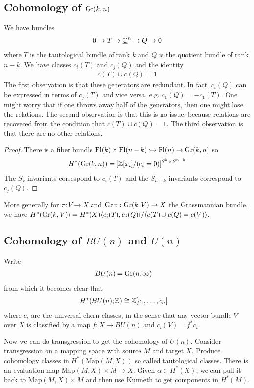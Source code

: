 \documentclass[12pt]{article}
\begin{document}
    \subsection{Cohomology of $\operatorname{Gr}(k,n)$}
    We have bundles \begin{align*}
        0 \to T \to \underline{\mathbb{C}}^n \to Q \to 0
    \end{align*} where $T$ is the tautological bundle of rank $k$ and $Q$ is the quotient bundle of rank $n-k$. We have classes $c_i(T)$ and $c_j(Q)$ and the identity \begin{align*}
        c(T) \cup c(Q) = 1
    \end{align*} The first observation is that these generators are redundant. In fact, $c_i(Q)$ can be expressed in terms of $c_j(T)$ and vice versa, e.g. $c_1(Q) = -c_1(T)$. One might worry that if one throws away half of the generators, then one might lose the relations. The second observation is that this is no issue, because relations are recovered from the condition that $c(T) \cup c(Q) = 1$. The third observation is that there are no other relations. 

    \begin{proof}
        There is a fiber bundle $\operatorname{Fl}(k)\times \operatorname{Fl}(n-k) \hookrightarrow \operatorname{Fl}(n) \to \operatorname{Gr}(k,n)$ so \[H^*(\operatorname{Gr}(k,n)) = [\mathbb{Z}[x_i]/(e_i = 0)]^{S^k \times S^{n-k}}\] The $S_k$ invariants correspond to $c_i(T)$ and the $S_{n-k}$ invariants correspond to $c_j(Q)$. 
    \end{proof}
    More generally for $\pi:V\to X$ and $\operatorname{Gr} \pi: \operatorname{Gr}(k,V) \to X$ the Grassmannian bundle, we have $H^*(\operatorname{Gr}(k,V)) = H^*(X)\langle c_i(T), c_j(Q) \rangle/\langle c(T) \cup c(Q) = c(V) \rangle$.

    \subsection{Cohomology of $BU(n)$ and $U(n)$}

    Write \begin{align*}
    BU(n) &= \operatorname{Gr}(n, \infty) 
    \end{align*} from which it becomes clear that \begin{align*}
    H^*(BU(n); \mathbb{Z}) &\cong \mathbb{Z}[c_1,\dots, c_n]
    \end{align*} where $c_i$ are the universal chern classes, in the sense that any vector bundle $V$ over $X$ is classified by a map $f: X \to BU(n)$ and $c_i(V) = f^* c_i$. 

    Now we can do transgression to get the cohomology of $U(n)$. Consider transgression on a mapping space with source $M$ and target $X$. Produce cohomology classes in $H^*(\mathrm{Map}(M,X))$ so called tautological classes. There is an evaluation map $\mathrm{Map}(M,X) \times M \to X$. Given $\alpha \in H^*(X)$, we can pull it back to $\mathrm{Map}(M,X) \times M$ and then use Kunneth to get components in $H^*(M)$.
\end{document}

